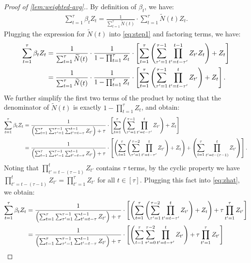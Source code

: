 \documentclass[12pt]{article}
\begin{document}
 

\begin{proof}[Proof of \cref{lem:weighted-avg}.]
By definition of $\beta_t$, we have:
\begin{align}\label{eq:step1}
    \sum_{t=1}^\tau \beta_t Z_t = \frac{1}{\sum_{t=1}^\tau \widetilde{N}(t)}\cdot \sum_{t=1}^\tau \widetilde{N}(t)Z_t.
\end{align}
Plugging the expression for $\widetilde{N}(t)$ into \eqref{eq:step1} and factoring terms, we have:
\begin{align}
    \sum_{t=1}^\tau \beta_t Z_t &= \frac{1}{\sum_{t=1}^\tau \widetilde{N}(t)} \cdot \frac{1}{1-\prod_{t=1}^\tau Z_t} \cdot \left[\sum_{t=1}^\tau\left(\sum_{\tau' = 1}^{\tau-1} \prod_{t'=t-\tau'}^{t-1}Z_{t'}Z_t \right)+ Z_t\right] \notag \\
    &= \frac{1}{\sum_{t=1}^\tau \widetilde{N}(t)} \cdot \frac{1}{1-\prod_{t=1}^\tau Z_t} \cdot \left[\sum_{t=1}^\tau\left(\sum_{\tau' = 1}^{\tau-1} \prod_{t'=t-\tau'}^{t}Z_{t'}\right)+ Z_t\right] \notag.
    \end{align}
We further simplify the first two terms of the product by noting that the denominator of $\widetilde{N}(t)$ is exactly $1-\prod_{t=1}^\tau Z_t$, and obtain:
\begin{align}\label{eq:zhat}
    \sum_{t=1}^\tau \beta_t Z_t &= \frac{1}{\left(\sum_{t=1}^\tau \sum_{\tau'=1}^{\tau-1}\sum_{t'=t-\tau}^{t-1}Z_{t'} \right) + \tau } \cdot { \left[\sum_{t=1}^\tau\left(\sum_{\tau' = 1}^{\tau-1} \prod_{t'=t-\tau'}^{t}Z_{t'}\right) + Z_t\right]} \notag \\
    &= \frac{1}{\left(\sum_{t=1}^\tau \sum_{\tau'=1}^{\tau-1}\sum_{t'=t-\tau}^{t-1}Z_{t'} \right) + \tau } \cdot \left[\left(\sum_{t=1}^\tau\left(\sum_{\tau' = 1}^{\tau-2} \prod_{t'=t-\tau'}^{t}Z_{t'}\right) + Z_t\right) +\left(\sum_{t=1}^\tau \prod_{t'=t-(\tau-1)}^{t}Z_{t'}\right)\right].
\end{align}
Noting that $\prod_{t'=t-(\tau-1)}^t Z_{t'}$ contains $\tau$ terms, by the cyclic property we have $\prod_{t'=t-(\tau-1)}^t Z_{t'} = \prod_{t'=1}^\tau Z_{t'}$ for all $t \in [\tau]$. Plugging this fact into \eqref{eq:zhat}, we obtain:
\begin{align}
    \sum_{t=1}^\tau \beta_t Z_t &= \frac{1}{\left(\sum_{t=1}^\tau \sum_{\tau'=1}^{\tau-1}\sum_{t'=t-\tau}^{t-1}Z_{t'} \right) + \tau } \cdot \left[\left(\sum_{t=1}^\tau\left(\sum_{\tau' = 1}^{\tau-2} \prod_{t'=t-\tau'}^{t}Z_{t'}\right) + Z_t\right) +\tau \prod_{t'=1}^{\tau}Z_{t'}\right] \notag \\
    &= \frac{1}{\left(\sum_{t=1}^\tau \sum_{\tau'=1}^{\tau-1}\sum_{t'=t-\tau}^{t-1}Z_{t'} \right) + \tau } \cdot \left[\left(\sum_{t=1}^\tau\sum_{\tau' = 0}^{\tau-2} \prod_{t'=t-\tau'}^{t}Z_{t'}\right) +\tau \prod_{t'=1}^{\tau}Z_{t'}\right] \label{eq:zero-indexing} \\

\end{align}
\end{proof}
\end{document}

